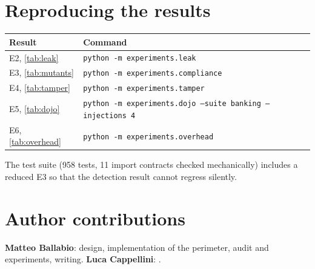 \section{Reproducing the results}
\label{app:repro}

{\small\begin{tabular}{@{}l l@{}}
\toprule
Result & Command \\
\midrule
E2, \cref{tab:leak} & \texttt{python -m experiments.leak} \\
E3, \cref{tab:mutants} & \texttt{python -m experiments.compliance} \\
E4, \cref{tab:tamper} & \texttt{python -m experiments.tamper} \\
E5, \cref{tab:dojo} & \texttt{python -m experiments.dojo --suite banking --injections 4} \\
E6, \cref{tab:overhead} & \texttt{python -m experiments.overhead} \\
\bottomrule
\end{tabular}}

\medskip
The test suite (958 tests, 11 import contracts checked mechanically) includes a reduced E3 so
that the detection result cannot regress silently.

\section{Author contributions}

\textbf{Matteo Ballabio}: design, implementation of the perimeter, audit and experiments,
writing. \textbf{Luca Cappellini}: .
